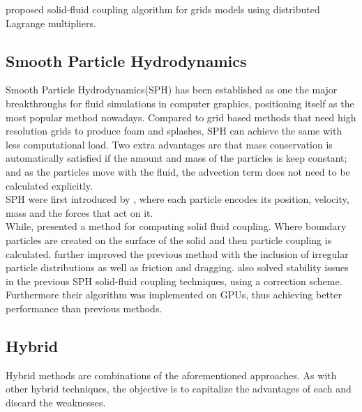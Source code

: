 \cite{Carlson2004} proposed solid-fluid coupling algorithm for grids models using distributed Lagrange multipliers.

\subsection{Smooth Particle Hydrodynamics}

Smooth Particle Hydrodynamics(SPH) has been established as one the major breakthroughs for fluid simulations in computer graphics, positioning itself as the most popular method nowadays.
Compared to grid based methods that need high resolution grids to produce foam and splashes, SPH can achieve the same with less computational load.
Two extra advantages are that mass conservation is automatically satisfied if the amount and mass of the particles is keep constant;
and as the particles move with the fluid, the advection term does not need to be calculated explicitly.\\

SPH were first introduced by \cite{DesbrunMathieuandGascuel1996}, where each particle encodes its position, velocity, mass and the forces that act on it.\\

While, \cite{Muller2004} presented a method for computing solid fluid coupling. Where boundary particles are created on the surface of the solid and then particle coupling is calculated.
\cite{Akinci2012} further improved the previous method with the inclusion of irregular particle distributions as well as friction and dragging. 
\cite{Shao2014} also solved stability issues in the previous SPH solid-fluid coupling techniques, using a correction scheme.
Furthermore their algorithm was implemented on GPUs, thus achieving better performance than previous methods.  

\subsection{Hybrid}

Hybrid methods are combinations of the aforementioned approaches.
As with other hybrid techniques, the objective is to capitalize the advantages of each and discard the weaknesses.\\

